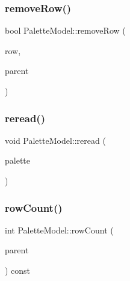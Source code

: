 \subsubsection{\texorpdfstring{removeRow()}{removeRow()}}
{\footnotesize\ttfamily bool Palette\+Model\+::remove\+Row (\begin{DoxyParamCaption}\item[{int}]{row,  }\item[{const Q\+Model\+Index \&}]{parent }\end{DoxyParamCaption})\hspace{0.3cm}{\ttfamily [inline]}}

\mbox{\label{class_palette_model_a349a1cb79eb3675e40a8ccbe3f801d01}} 
\subsubsection{\texorpdfstring{reread()}{reread()}}
{\footnotesize\ttfamily void Palette\+Model\+::reread (\begin{DoxyParamCaption}\item[{\mbox{\hyperlink{class_palette}{Palette}} $\ast$}]{palette }\end{DoxyParamCaption})\hspace{0.3cm}{\ttfamily [inline]}}

\mbox{\label{class_palette_model_a4e78b9a576e8d7de8bb7a9e5b7c9eded}} 
\subsubsection{\texorpdfstring{rowCount()}{rowCount()}}
{\footnotesize\ttfamily int Palette\+Model\+::row\+Count (\begin{DoxyParamCaption}\item[{const Q\+Model\+Index \&}]{parent }\end{DoxyParamCaption}) const\hspace{0.3cm}{\ttfamily [inline]}}

\mbox{\label{class_palette_model_aff3615f74814639acb99780a1a115993}} 
